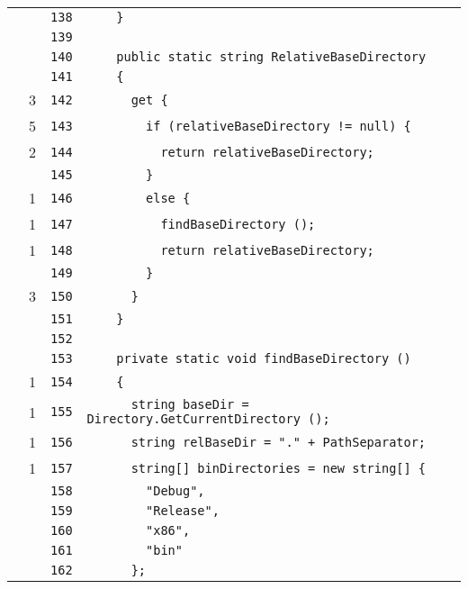 \documentclass[a4paper,10pt]{article}
\begin{document}
\begin{longtable}[l]{lrrl}
\cellcolor{gray} &  & \verb~138~ & \verb~    }~\\
\cellcolor{gray} &  & \verb~139~ & \verb~~\\
\cellcolor{gray} &  & \verb~140~ & \verb~    public static string RelativeBaseDirectory~\\
\cellcolor{gray} &  & \verb~141~ & \verb~    {~\\
\cellcolor{green} & 3 & \verb~142~ & \verb~      get {~\\
\cellcolor{green} & 5 & \verb~143~ & \verb~        if (relativeBaseDirectory != null) {~\\
\cellcolor{green} & 2 & \verb~144~ & \verb~          return relativeBaseDirectory;~\\
\cellcolor{gray} &  & \verb~145~ & \verb~        }~\\
\cellcolor{green} & 1 & \verb~146~ & \verb~        else {~\\
\cellcolor{green} & 1 & \verb~147~ & \verb~          findBaseDirectory ();~\\
\cellcolor{green} & 1 & \verb~148~ & \verb~          return relativeBaseDirectory;~\\
\cellcolor{gray} &  & \verb~149~ & \verb~        }~\\
\cellcolor{green} & 3 & \verb~150~ & \verb~      }~\\
\cellcolor{gray} &  & \verb~151~ & \verb~    }~\\
\cellcolor{gray} &  & \verb~152~ & \verb~~\\
\cellcolor{gray} &  & \verb~153~ & \verb~    private static void findBaseDirectory ()~\\
\cellcolor{green} & 1 & \verb~154~ & \verb~    {~\\
\cellcolor{green} & 1 & \verb~155~ & \verb~      string baseDir = Directory.GetCurrentDirectory ();~\\
\cellcolor{green} & 1 & \verb~156~ & \verb~      string relBaseDir = "." + PathSeparator;~\\
\cellcolor{green} & 1 & \verb~157~ & \verb~      string[] binDirectories = new string[] {~\\
\cellcolor{gray} &  & \verb~158~ & \verb~        "Debug",~\\
\cellcolor{gray} &  & \verb~159~ & \verb~        "Release",~\\
\cellcolor{gray} &  & \verb~160~ & \verb~        "x86",~\\
\cellcolor{gray} &  & \verb~161~ & \verb~        "bin"~\\
\cellcolor{gray} &  & \verb~162~ & \verb~      };~\\

\end{longtable}
\end{document}
